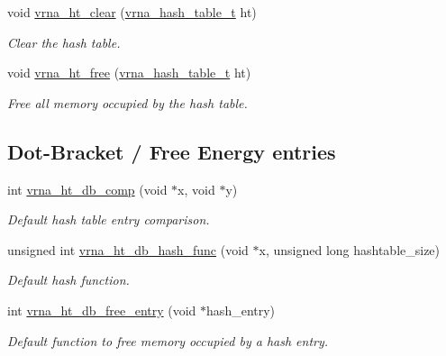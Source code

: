 \begin{DoxyCompactItemize}
void \mbox{\hyperlink{group__hash__table__utils_gab90583f8f7395e735c865ad2ebdb3c29}{vrna\+\_\+ht\+\_\+clear}} (\mbox{\hyperlink{group__hash__table__utils_gabc7c6f41b718c8e23929e528891a89c4}{vrna\+\_\+hash\+\_\+table\+\_\+t}} ht)
\begin{DoxyCompactList}\small\item\em Clear the hash table. \end{DoxyCompactList}\item 
void \mbox{\hyperlink{group__hash__table__utils_ga479db024c70437aa2576d60b373c5262}{vrna\+\_\+ht\+\_\+free}} (\mbox{\hyperlink{group__hash__table__utils_gabc7c6f41b718c8e23929e528891a89c4}{vrna\+\_\+hash\+\_\+table\+\_\+t}} ht)
\begin{DoxyCompactList}\small\item\em Free all memory occupied by the hash table. \end{DoxyCompactList}\end{DoxyCompactItemize}
\subsection*{Dot-\/\+Bracket / Free Energy entries}
\begin{DoxyCompactItemize}
\item 
int \mbox{\hyperlink{group__hash__table__utils_gac4ec0b8372d50d7347a63f140f340962}{vrna\+\_\+ht\+\_\+db\+\_\+comp}} (void $\ast$x, void $\ast$y)
\begin{DoxyCompactList}\small\item\em Default hash table entry comparison. \end{DoxyCompactList}\item 
unsigned int \mbox{\hyperlink{group__hash__table__utils_gad133721a3cd2f8ca259fe315d86035a7}{vrna\+\_\+ht\+\_\+db\+\_\+hash\+\_\+func}} (void $\ast$x, unsigned long hashtable\+\_\+size)
\begin{DoxyCompactList}\small\item\em Default hash function. \end{DoxyCompactList}\item 
int \mbox{\hyperlink{group__hash__table__utils_gabcdcd0d070b3dfd2634a09e7838acf66}{vrna\+\_\+ht\+\_\+db\+\_\+free\+\_\+entry}} (void $\ast$hash\+\_\+entry)
\begin{DoxyCompactList}\small\item\em Default function to free memory occupied by a hash entry. \end{DoxyCompactList}\end{DoxyCompactItemize}


